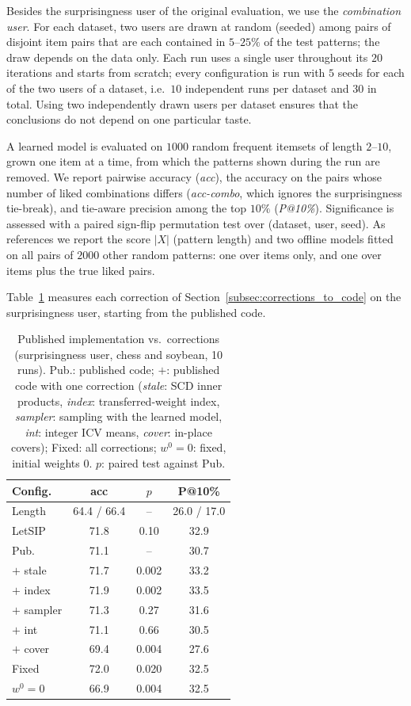 \documentclass[sigconf]{acmart}
\begin{document}
Besides the surprisingness user of the original evaluation, we use the \emph{combination user}. For each dataset, two users are drawn at random (seeded) among pairs of disjoint item pairs that are each contained in $5$--$25\%$ of the test patterns; the draw depends on the data only. Each run uses a single user throughout its $20$ iterations and starts from scratch; every configuration is
run with $5$ seeds for each of the two users of a dataset, i.e.\ $10$ independent runs per dataset and $30$ in total. Using two independently drawn users per dataset ensures that the conclusions do not depend on one particular taste.

A learned model is evaluated on $1000$ random frequent itemsets of length $2$--$10$, grown one item at a time, from which the patterns shown during the run are removed. We report pairwise accuracy (\emph{acc}), the accuracy on the pairs whose number of liked combinations differs (\emph{acc-combo}, which ignores the surprisingness tie-break), and tie-aware precision among the top $10\%$ (\emph{P@10\%}). Significance is
assessed with a paired sign-flip permutation test over (dataset, user, seed). As references we report the score $|X|$ (pattern length) and two offline models fitted on all pairs of $2000$ other random patterns: one over items only, and one over items plus the true liked pairs.

Table~\ref{tab:fidelity} measures each correction of Section~\ref{subsec:corrections_to_code} on the surprisingness user, starting from the published code.

\begin{table}[t]
\centering
\caption{Published implementation vs.\ corrections (surprisingness user, chess and soybean, 10 runs).
Pub.: published code; $+$: published code with one correction (\emph{stale}: SCD inner products,
\emph{index}: transferred-weight index, \emph{sampler}: sampling with the learned model, \emph{int}: integer
ICV means, \emph{cover}: in-place covers); Fixed: all corrections; $w^0 = 0$: fixed, initial weights $0$.
$p$: paired test against Pub.}
\label{tab:fidelity}
\small
\begin{tabular}{lccc}
\toprule
Config. & acc & $p$ & P@10\% \\
\midrule
Length          & 64.4 / 66.4 & --    & 26.0 / 17.0 \\
LetSIP          & 71.8 & 0.10  & 32.9 \\
Pub.            & 71.1 & --    & 30.7 \\
$+$ stale       & 71.7 & 0.002 & 33.2 \\
$+$ index       & 71.9 & 0.002 & 33.5 \\
$+$ sampler     & 71.3 & 0.27  & 31.6 \\
$+$ int         & 71.1 & 0.66  & 30.5 \\
$+$ cover       & 69.4 & 0.004 & 27.6 \\
Fixed           & 72.0 & 0.020 & 32.5 \\
$w^0 = 0$       & 66.9 & 0.004 & 32.5 \\
\bottomrule
\end{tabular}
\end{table}
\end{document}
